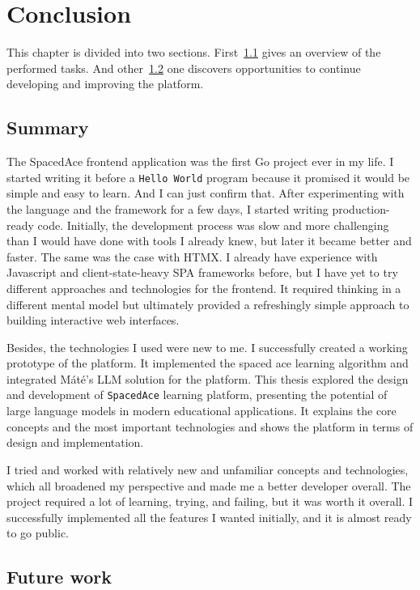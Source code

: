 \chapter{Conclusion}\label{ch:conclusion-and-future-work}

This chapter is divided into two sections. First~\ref{sec:summary} gives an overview of the performed tasks. And other~\ref{sec:future-work} one discovers opportunities to continue developing and improving the platform.

\section{Summary}\label{sec:summary}

The SpacedAce frontend application was the first Go project ever in my life. I started writing it before a \texttt{Hello World} program because it promised it would be simple and easy to learn. And I can just confirm that. After experimenting with the language and the framework for a few days, I started writing production-ready code. Initially, the development process was slow and more challenging than I would have done with tools I already knew, but later it became better and faster. The same was the case with HTMX. I already have experience with Javascript and client-state-heavy SPA frameworks before, but I have yet to try different approaches and technologies for the frontend. It required thinking in a different mental model but ultimately provided a refreshingly simple approach to building interactive web interfaces.

Besides, the technologies I used were new to me. I successfully created a working prototype of the platform. It implemented the spaced ace learning algorithm and integrated Máté's LLM solution for the platform. This thesis explored the design and development of \texttt{SpacedAce} learning platform, presenting the potential of large language models in modern educational applications. It explains the core concepts and the most important technologies and shows the platform in terms of design and implementation.

I tried and worked with relatively new and unfamiliar concepts and technologies, which all broadened my perspective and made me a better developer overall. The project required a lot of learning, trying, and failing, but it was worth it overall. I successfully implemented all the features I wanted initially, and it is almost ready to go public.

\section{Future work}\label{sec:future-work}

